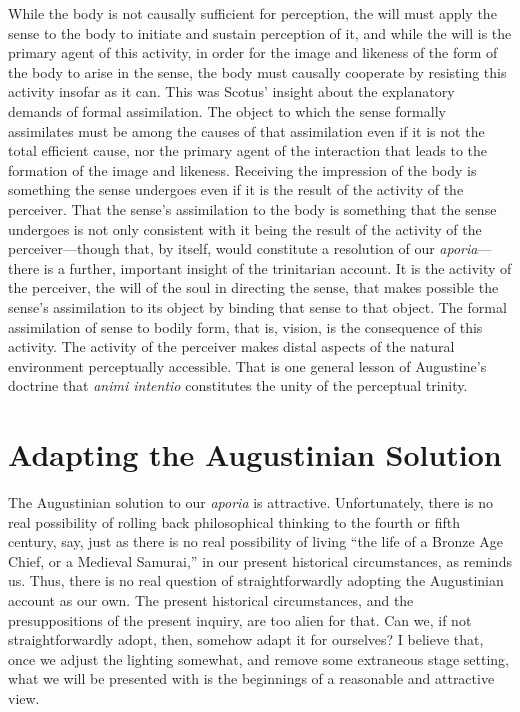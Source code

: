 \documentclass[12pt]{article}
\begin{document}
While the body is not causally sufficient for perception, the will must apply the sense to the body to initiate and sustain perception of it, and while the will is the primary agent of this activity, in order for the image and likeness of the form of the body to arise in the sense, the body must causally cooperate by resisting this activity insofar as it can. This was Scotus' insight about the explanatory demands of formal assimilation. The object to which the sense formally assimilates must be among the causes of that assimilation even if it is not the total efficient cause, nor the primary agent of the interaction that leads to the formation of the image and likeness. Receiving the impression of the body is something the sense undergoes even if it is the result of the activity of the perceiver. That the sense's assimilation to the body is something that the sense undergoes is not only consistent with it being the result of the activity of the perceiver---though that, by itself, would constitute a resolution of our \emph{aporia}---there is a further, important insight of the trinitarian account. It is the activity of the perceiver, the will of the soul in directing the sense, that makes possible the sense's assimilation to its object by binding that sense to that object. The formal assimilation of sense to bodily form, that is, vision, is the consequence of this activity. The activity of the perceiver makes distal aspects of the natural environment perceptually accessible. That is one general lesson of Augustine's doctrine that \emph{animi intentio} constitutes the unity of the perceptual trinity.


\section{Adapting the Augustinian Solution} %
\label{sec:adapting_the_augustinian_solution}

The Augustinian solution to our \emph{aporia} is attractive. Unfortunately, there is no real possibility of rolling back philosophical thinking to the fourth or fifth century, say, just as there is no real possibility of living ``the life of a Bronze Age Chief, or a Medieval Samurai,'' in our present historical circumstances, as \citet[140]{Williams:1981rt} reminds us. Thus, there is no real question of straightforwardly adopting the Augustinian account as our own. The present historical circumstances, and the presuppositions of the present inquiry, are too alien for that. Can we, if not straightforwardly adopt, then, somehow adapt it for ourselves? I believe that, once we adjust the lighting somewhat, and remove some extraneous stage setting, what we will be presented with is the beginnings of a reasonable and attractive view.
\end{document}
